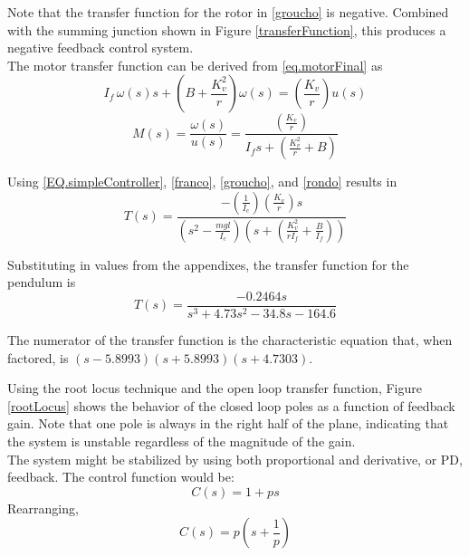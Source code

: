 \documentclass[12pt,letterpaper]{article}
\begin{document}
Note that the transfer function for the rotor in \eqref{groucho} is negative.  Combined with the summing
junction shown in Figure \ref{transferFunction}, this produces a negative feedback control system.\\
 


The motor transfer function can be derived from \eqref{eq.motorFinal} as
\begin{equation}
    I_{f} \, \omega(s) s + \left( B+\frac{K_{v}^2}{r} \right) \omega(s) = \left(\frac{K_{v}} {r}\right)u(s)
\end{equation}
%
\begin{equation}
    M(s) = \frac{\omega(s)}{u(s)} =  \frac{\left(\frac{K_{v}} {r}\right)}{I_{f} s + (\frac{K_{v}^2}{r}+B)}
    \label{rondo}
\end{equation} 

Using \eqref{EQ.simpleController}, \eqref{franco}, \eqref{groucho}, and \eqref{rondo} results in 
%
\begin{equation}
	T(s) =\frac{-(\frac{1} {I_{c}})(\frac{K_{v}}{r})s}
	{(s^2-\frac{m g l}{I_{c}})(s+(\frac{K_{v}^2}{r I_{f}}+\frac{B}{I_{f}}))}
\end{equation}

Substituting in values from the appendixes, the transfer function for the pendulum is
\begin{equation}
	T(s) =\frac{-0.2464 s}{s^3 + 4.73 s^2 -34.8 s -164.6}
\end{equation}

The numerator of the transfer function is the characteristic equation that, when factored, is
$(s-5.8993) (s+5.8993) (s+4.7303)$.

Using the root locus technique and the open loop transfer function, Figure \ref{rootLocus} shows the
behavior of the closed loop poles as a function of feedback gain.  Note that one pole is always in the right
half of the plane, indicating that the system is unstable regardless of the magnitude of the gain. \\


The system might be stabilized by using both proportional and derivative, or PD, feedback.  The control function would be:
\begin{equation}
	C(s) = 1 + p s
\end{equation}
Rearranging,
\begin{equation}
	C(s) = p\left(s+\frac{1}{p}\right)\label{pd}
\end{equation}
\end{document}
